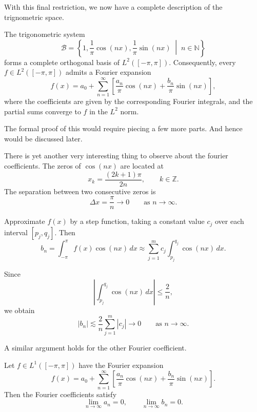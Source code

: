\documentclass[10pt,a4paper]{article}
\begin{document}
With this final restriction, we now have a complete description of the trignometric space.
\begin{theorem}
The trigonometric system
\[
    \mathcal{B}
    =
    \left\{
    1,\frac{1}{\pi}\cos(nx),\frac{1}{\pi}\sin(nx)
    \;\middle|\; n\in\mathbb{N}
    \right\}
\]
forms a complete orthogonal basis of
\(L^2([-\pi,\pi])\). Consequently, every \(f\in L^2([-\pi,\pi])\) admits a
Fourier expansion
\[
    f(x)=a_0+\sum_{n=1}^{\infty}
    \left[
        \frac{a_n}{\pi}\cos(nx)
        +\frac{b_n}{\pi}\sin(nx)
    \right],
\]
where the coefficients are given by the corresponding
Fourier integrals, and the partial sums converge to \(f\)
in the \(L^2\) norm.
\end{theorem}
The formal proof of this would require piecing a few more parts. And hence would be discussed later.


There is yet another very interesting thing to observe about the fourier coefficients. The zeros of \(\cos(nx)\) are located at
\[
    x_k=\frac{(2k+1)\pi}{2n},
    \qquad k\in\mathbb Z.
\]
The separation between two consecutive zeros is
\[
    \Delta x=\frac{\pi}{n}\longrightarrow 0
    \qquad \text{as } n\to\infty.
\]

Approximate \(f(x)\) by a step function, taking a
constant value \(c_j\) over each interval
\([p_j,q_j]\). Then
\[
    b_n=\int_{-\pi}^{\pi}f(x)\cos(nx)\,dx
    \approx
    \sum_{j=1}^{m}c_j
    \int_{p_j}^{q_j}\cos(nx)\,dx.
\]

Since
\[
    \left|\int_{p_j}^{q_j}\cos(nx)\,dx\right|
    \leq \frac{2}{n},
\]
we obtain
\[
    |b_n|
    \lesssim
    \frac{2}{n}\sum_{j=1}^{m}|c_j|
    \longrightarrow 0
    \qquad \text{as }n\to\infty.
\]

A similar argument holds for the other Fourier coefficient.
\begin{theorem}
Let \(f\in L^1([-\pi,\pi])\) have the Fourier expansion
\[
    f(x)=a_0+\sum_{n=1}^{\infty}
    \left[
        \frac{a_n}{\pi}\cos(nx)
        +\frac{b_n}{\pi}\sin(nx)
    \right].
\]
Then the Fourier coefficients satisfy
\[
    \lim_{n\to\infty}a_n=0,
    \qquad
    \lim_{n\to\infty}b_n=0.
\]
\end{theorem}
\end{document}

